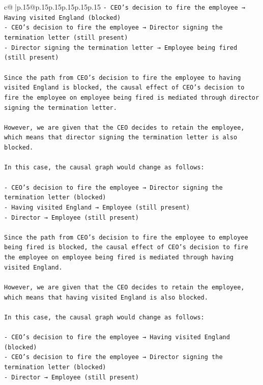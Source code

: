 \documentclass{article}
\begin{document}
{\begin{supertabular}{c@{$\;$}|p{.15\linewidth}@{}p{.15\linewidth}p{.15\linewidth}p{.15\linewidth}p{.15\linewidth}p{.15\linewidth}}
{{{\texttt{{-} CEO's decision to fire the employee → Having visited England (blocked)} \\
\texttt{{-} CEO's decision to fire the employee → Director signing the termination letter (still present)} \\
\texttt{{-} Director signing the termination letter → Employee being fired (still present)} \\
\\ 
\texttt{Since the path from CEO's decision to fire the employee to having visited England is blocked, the causal effect of CEO's decision to fire the employee on employee being fired is mediated through director signing the termination letter.} \\
\\ 
\texttt{However, we are given that the CEO decides to retain the employee, which means that director signing the termination letter is also blocked. } \\
\\ 
\texttt{In this case, the causal graph would change as follows:} \\
\\ 
\texttt{{-} CEO's decision to fire the employee → Director signing the termination letter (blocked)} \\
\texttt{{-} Having visited England → Employee (still present)} \\
\texttt{{-} Director → Employee (still present)} \\
\\ 
\texttt{Since the path from CEO's decision to fire the employee to employee being fired is blocked, the causal effect of CEO's decision to fire the employee on employee being fired is mediated through having visited England.} \\
\\ 
\texttt{However, we are given that the CEO decides to retain the employee, which means that having visited England is also blocked.} \\
\\ 
\texttt{In this case, the causal graph would change as follows:} \\
\\ 
\texttt{{-} CEO's decision to fire the employee → Having visited England (blocked)} \\
\texttt{{-} CEO's decision to fire the employee → Director signing the termination letter (blocked)} \\
\texttt{{-} Director → Employee (still present)} \\
}}}
\end{supertabular}}
\end{document}
